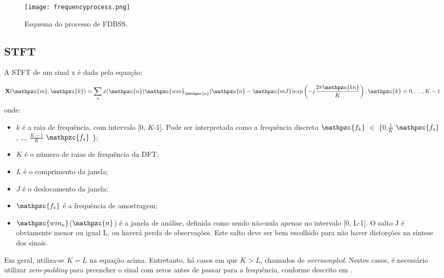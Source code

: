         \begin{figure}[h!]
            \texttt{[image: frequencyprocess.png]}
            \caption{Esquema do processo de FDBSS.}
            \label{fig:frequencymodel}
        \end{figure}

    \subsection{STFT} \label{sec:stft}
        A STFT de um sinal x é dada pela equação:

    \begin{equation}\label{eq:STFT}
        \mathbf{X}(\mathpzc{m},\mathpzc{k})
        = \sum_{n} x(\mathpzc{n})
        \mathpzc{win}_\mathpzc{a}(\mathpzc{n} - \mathpzc{mJ})
        exp \left( -j \frac{2\pi\mathpzc{kn}}{K} \right), \mathpzc{k} = 0, \dots, K-1
    \end{equation}
    onde:
    \begin{itemize}
        
        \item $k$ é a raia de frequência, com intervalo [0, $K$-1]. Pode ser interpretada como a frequência discreta $\mathpzc{f_k}$ $\in$ \big\{0,$\frac{1}{K}$ $\mathpzc{f_s}$, \dots, $\frac{K-1}{K}$ $\mathpzc{f_s}$ \big\};
                    
        \item $K$ é o número de raias de frequência da DFT;
                    
        \item $L$ é o comprimento da janela;
                    
        \item $J$ é o deslocamento da janela;
        
        \item  $\mathpzc{f_s}$ é a frequência de amostragem;
        
        \item $\mathpzc{win_a}$($\mathpzc{n}$) é a janela de análise, definida como sendo não-nula apenas no intervalo [0, L-1]. O salto J é obviamente menor ou igual L, ou haverá perda de observações. Este salto deve ser bem escolhido para não haver distorções na síntese dos sinais.
    \end{itemize}
    
        Em geral, utiliza-se $K=L$ na equação acima. Entretanto, há casos em que $K>L$, chamados de \textit{oversampled}. Nestes casos, é necessário utilizar \textit{zero-padding} para preencher o sinal com zeros antes de passar para a frequência, conforme descrito em \cite{STFT}.
        
